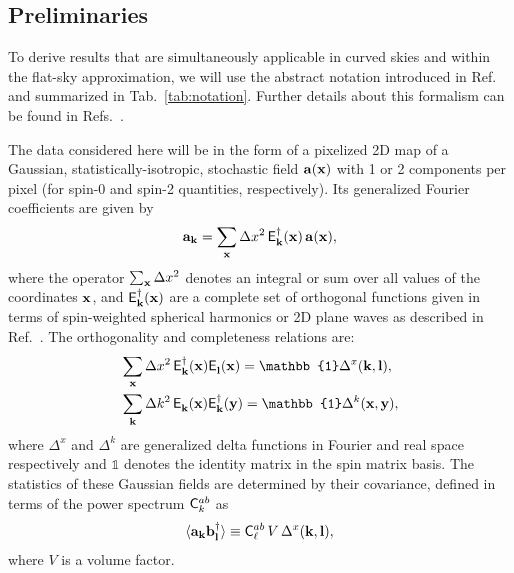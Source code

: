 \documentclass[a4paper,11pt]{article}
\newcommand{\summ}[1]{\sum_{\bf #1}\Delta #1^2}
\newcommand{\Ylm}[3]{{\sf E}^{#1}_{\bf #2}({\bf #3})}
\begin{document}
    \subsection{Preliminaries}\label{ssec:pcl.prelim}
    
      To derive results that are simultaneously applicable in curved skies and within the flat-sky approximation, we will use the abstract notation introduced in Ref.~\cite{1906.11765} and summarized in Tab.~\ref{tab:notation}. Further details about this formalism can be found in Refs.~\cite{1809.09603,1906.11765}.

      The data considered here will be in the form of a pixelized 2D map of a Gaussian, statistically-isotropic, stochastic field ${\bf a}({\bf x})$ with 1 or 2 components per pixel (for spin-0 and spin-2 quantities, respectively).
      Its generalized Fourier coefficients are given by \begin{equation}
        {\bf a}_{\bf k}=\summ{x}\,\Ylm{\dag}{k}{x}\,{\bf a}({\bf x}),
      \end{equation}
      where the operator $\summ{x}$ denotes an integral or sum over all values of the coordinates ${\bf x}$, and $\Ylm{\dag}{k}{x}$ are a complete set of orthogonal functions given in terms of spin-weighted spherical harmonics or 2D plane waves as described in Ref.~\cite{1809.09603}. The orthogonality and completeness relations are:
      \begin{align}
        &\summ{x}\,\Ylm{\dag}{k}{x}\Ylm{}{l}{x}=\mathbb{1}\Delta^x({\bf k},{\bf l}),\\
        &\summ{k}\,\Ylm{}{k}{x}\Ylm{\dag}{k}{y}=\mathbb{1}\Delta^k({\bf x},{\bf y}),
      \end{align}
      where $\Delta^x$ and $\Delta^k$ are generalized delta functions in Fourier and real space respectively and $\mathbb{1}$ denotes the identity matrix in the spin matrix basis.
      The statistics of these Gaussian fields are determined by their covariance, defined in terms of the power spectrum ${\sf C}^{ab}_k$ as
      \begin{equation}\label{eq:iso}
        \langle {\bf a}_{\bf k}{\bf b}^\dag_{\bf l}\rangle\equiv {\sf C}^{ab}_\ell\,V\,\Delta^x({\bf k},{\bf l}),
      \end{equation}
      where $V$ is a volume factor. 
\end{document}
